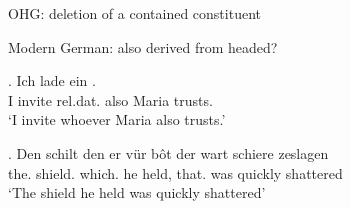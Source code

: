 \documentclass[12pt]{beamer}
\newcommand*{\mybox}[1]{\framebox{#1}} %
\begin{document}
\begin{frame}{OHG: deletion of a contained constituent}
{\phantom{x}

}

\end{frame}





\begin{frame}{Modern German: also derived from headed?}

\exg. Ich {lade ein} \mybox{\tbf{wem}}   . \\
 I invite\scsub{[acc]} \ac{rel}.\ac{dat}. also Maria trusts\scsub{[dat]}.\\
 `I invite whoever Maria also trusts.' \label{ex:mg-acc-dat}

\pause

\exg. Den schilt den er {vür bôt} der wart schiere zeslagen\\
the. shield. which. he held, that. was quickly shattered\\
`The shield he held was quickly shattered' \label{ex:iaheaded}

\pause


\end{frame}
\end{document}
